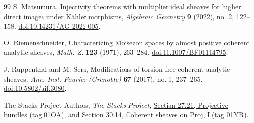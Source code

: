 \documentclass[11pt,reqno]{amsart}
\numberwithin{equation}{section}
\theoremstyle{definition}
\theoremstyle{remark}
\begin{document}
\begin{thebibliography}{99}
S. Matsumura, Injectivity theorems with multiplier ideal sheaves for higher direct images under K\"ahler morphisms,
\emph{Algebraic Geometry} \textbf{9} (2022), no. 2, 122--158.
\href{https://doi.org/10.14231/AG-2022-005}{doi:10.14231/AG-2022-005}.

O. Riemenschneider, Characterizing Moi\v sezon spaces by almost positive coherent analytic sheaves,
\emph{Math. Z.} \textbf{123} (1971), 263--284.
\href{https://doi.org/10.1007/BF01114795}{doi:10.1007/BF01114795}.

J. Ruppenthal and M. Sera,
Modifications of torsion-free coherent analytic sheaves,
\emph{Ann. Inst. Fourier (Grenoble)} \textbf{67} (2017), no. 1, 237--265.
\href{https://doi.org/10.5802/aif.3080}{doi:10.5802/aif.3080}.

The Stacks Project Authors, \emph{The Stacks Project},
\href{https://stacks.math.columbia.edu/tag/01OA}{Section 27.21, Projective bundles (tag 01OA)}, and
\href{https://stacks.math.columbia.edu/tag/01YR}{Section 30.14, Coherent sheaves on Proj, I (tag 01YR)}.

\end{thebibliography}
\end{document}
